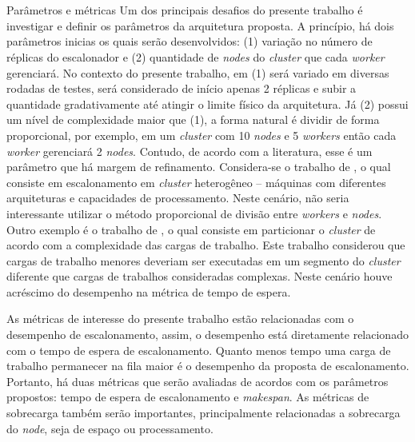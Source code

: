 \documentclass[
	12pt,				%
	openright,			%
	oneside,			%
	a4paper,			%
	brazil				%
	]{abntex2}
\begin{document}
\section{}{Parâmetros e métricas}
Um dos principais desafios do presente trabalho é investigar e definir os parâmetros da arquitetura proposta. A princípio, há dois parâmetros inicias os quais serão desenvolvidos: (1) variação no número de réplicas do escalonador e (2) quantidade de \textit{nodes} do \textit{cluster} que cada \textit{worker} gerenciará. No contexto do presente trabalho, em (1) será variado em diversas rodadas de testes, será considerado de início apenas 2 réplicas e subir a quantidade gradativamente até atingir o limite físico da arquitetura. Já (2) possui um nível de complexidade maior que (1), a forma natural é dividir de forma proporcional, por exemplo, em um \textit{cluster} com 10 \textit{nodes} e 5 \textit{workers} então cada \textit{worker} gerenciará 2 \textit{nodes}. Contudo, de acordo com a literatura, esse é um parâmetro que há margem de refinamento. Considera-se o trabalho de , o qual consiste em escalonamento em \textit{cluster} heterogêneo -- máquinas com diferentes arquiteturas e capacidades de processamento. Neste cenário, não seria interessante utilizar o método proporcional de divisão entre \textit{workers} e \textit{nodes}. Outro exemplo é o trabalho de , o qual consiste em particionar o \textit{cluster} de acordo com a complexidade das cargas de trabalho. Este trabalho considerou que cargas de trabalho menores deveriam ser executadas em um segmento do \textit{cluster} diferente que cargas de trabalhos consideradas complexas. Neste cenário houve acréscimo do desempenho na métrica de tempo de espera.

As métricas de interesse do presente trabalho estão relacionadas com o desempenho de escalonamento, assim, o desempenho está diretamente relacionado com o tempo de espera de escalonamento. Quanto menos tempo uma carga de trabalho permanecer na fila maior é o desempenho da proposta de escalonamento. Portanto, há duas métricas que serão avaliadas de acordos com os parâmetros propostos: tempo de espera de escalonamento e \textit{makespan}. As métricas de sobrecarga também serão importantes, principalmente relacionadas a sobrecarga do \textit{node}, seja de espaço ou processamento.

\end{document}
